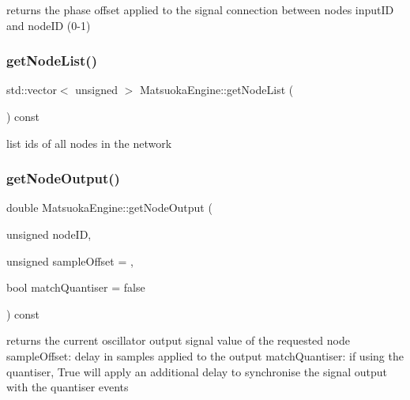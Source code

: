 returns the phase offset applied to the signal connection between nodes input\+ID and node\+ID (0-\/1) 

\mbox{\label{classMatsuokaEngine_ae8f070a75e9005f6cc1f3c2b33c4baf5}} 
\subsubsection{\texorpdfstring{get\+Node\+List()}{getNodeList()}}
{\footnotesize\ttfamily std\+::vector$<$ unsigned $>$ Matsuoka\+Engine\+::get\+Node\+List (\begin{DoxyParamCaption}{ }\end{DoxyParamCaption}) const}



list ids of all nodes in the network 

\mbox{\label{classMatsuokaEngine_a72ba599f12e55273f7298a70e7f0eff7}} 
\subsubsection{\texorpdfstring{get\+Node\+Output()}{getNodeOutput()}}
{\footnotesize\ttfamily double Matsuoka\+Engine\+::get\+Node\+Output (\begin{DoxyParamCaption}\item[{unsigned}]{node\+ID,  }\item[{unsigned}]{sample\+Offset = {},  }\item[{bool}]{match\+Quantiser = {\ttfamily false} }\end{DoxyParamCaption}) const}

returns the current oscillator output signal value of the requested node sample\+Offset\+: delay in samples applied to the output match\+Quantiser\+: if using the quantiser, True will apply an additional delay to synchronise the signal output with the quantiser events \mbox{\label{classMatsuokaEngine_a5d808db0af62f65826f0fcbc47625205}} 
